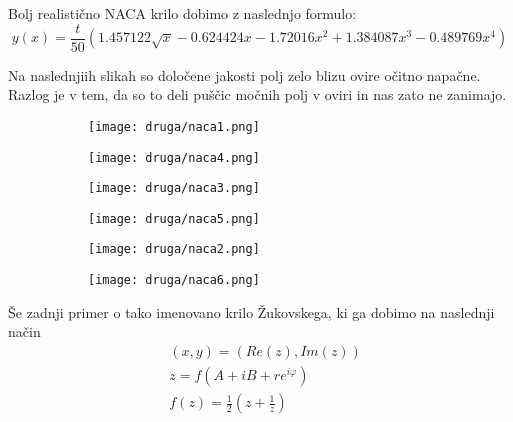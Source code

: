 \documentclass{article}
\begin{document}
Bolj realistično NACA krilo dobimo z naslednjo formulo:
\begin{equation*}
y(x) = \frac{t}{50} \left( 1.457122 \sqrt{x} - 0.624424 x - 1.72016 x^2 + 1.384087 x^3 - 0.489769 x^4 \right)
\end{equation*}

Na naslednjiih slikah so določene jakosti polj zelo blizu ovire očitno napačne. Razlog je v tem, da so to deli puščic močnih polj v oviri in nas zato ne zanimajo.

\begin{figure}[H]
\centering
\begin{subfigure}{.49\textwidth}
\texttt{[image: druga/naca1.png]}
\end{subfigure}
\begin{subfigure}{.49\textwidth}
\texttt{[image: druga/naca4.png]}
\end{subfigure}
\caption*{}
\end{figure}


\begin{figure}[H]
\centering
\begin{subfigure}{.49\textwidth}
\texttt{[image: druga/naca3.png]}
\end{subfigure}
\begin{subfigure}{.49\textwidth}
\texttt{[image: druga/naca5.png]}
\end{subfigure}
\caption*{}
\end{figure}


\begin{figure}[H]
\centering
\begin{subfigure}{.49\textwidth}
\texttt{[image: druga/naca2.png]}
\end{subfigure}
\begin{subfigure}{.49\textwidth}
\texttt{[image: druga/naca6.png]}
\end{subfigure}
\caption*{}
\end{figure}


Še zadnji primer o tako imenovano krilo Žukovskega, ki ga dobimo na naslednji način
\begin{align*}
&(x,y) = (Re(z),Im(z)) \\
&z = f\left(A + iB + r e^{i\varphi}\right) \\
&f(z) = \frac{1}{2} \left( z + \frac{1}{z} \right) \\
\end{align*}
\end{document}
